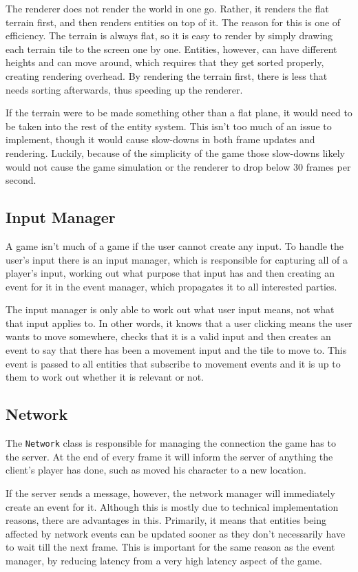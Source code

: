 The renderer does not render the world in one go. Rather, it renders the flat terrain first, and then renders entities on top of it. The reason for this is one of efficiency. The terrain is always flat, so it is easy to render by simply drawing each terrain tile to the screen one by one. Entities, however, can have different heights and can move around, which requires that they get sorted properly, creating rendering overhead. By rendering the terrain first, there is less that needs sorting afterwards, thus speeding up the renderer.

If the terrain were to be made something other than a flat plane, it would need to be taken into the rest of the entity system. This isn't too much of an issue to implement, though it would cause slow-downs in both frame updates and rendering. Luckily, because of the simplicity of the game those slow-downs likely would not cause the game simulation or the renderer to drop below 30 frames per second.

\subsection{Input Manager}
A game isn't much of a game if the user cannot create any input. To handle the user's input there is an input manager, which is responsible for capturing all of a player's input, working out what purpose that input has and then creating an event for it in the event manager, which propagates it to all interested parties.

The input manager is only able to work out what user input means, not what that input applies to. In other words, it knows that a user clicking means the user wants to move somewhere, checks that it is a valid input and then creates an event to say that there has been a movement input and the tile to move to. This event is passed to all entities that subscribe to movement events and it is up to them to work out whether it is relevant or not.

\subsection{Network}
The \texttt{Network} class is responsible for managing the connection the game has to the server. At the end of every frame it will inform the server of anything the client's player has done, such as moved his character to a new location.

If the server sends a message, however, the network manager will immediately create an event for it. Although this is mostly due to technical implementation reasons, there are advantages in this. Primarily, it means that entities being affected by network events can be updated sooner as they don't necessarily have to wait till the next frame. This is important for the same reason as the event manager, by reducing latency from a very high latency aspect of the game.

